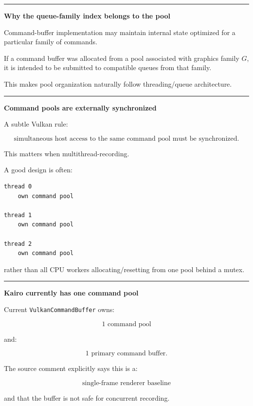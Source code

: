 \begin{center}\rule{0.5\linewidth}{0.5pt}\end{center}

\textbf{Why the queue-family index belongs to the pool}

Command-buffer implementation may maintain internal state optimized for a particular family of commands.

If a command buffer was allocated from a pool associated with graphics family \(G\), it is intended to be submitted to compatible queues from that family.

This makes pool organization naturally follow threading/queue architecture.

\begin{center}\rule{0.5\linewidth}{0.5pt}\end{center}

\textbf{Command pools are externally synchronized}

A subtle Vulkan rule:

\[
\boxed{
\text{simultaneous host access to the same command pool must be synchronized}.
}
\]

This matters when multithread-recording.

A good design is often:

\begin{verbatim}
thread 0
    own command pool

thread 1
    own command pool

thread 2
    own command pool
\end{verbatim}

rather than all CPU workers allocating/resetting from one pool behind a mutex.

\begin{center}\rule{0.5\linewidth}{0.5pt}\end{center}

\textbf{Kairo currently has one command pool}

Current \texttt{VulkanCommandBuffer} owns:

\[
1\text{ command pool}
\]

and:

\[
1\text{ primary command buffer}.
\]

The source comment explicitly says this is a:

\[
\boxed{\text{single-frame renderer baseline}}
\]

and that the buffer is not safe for concurrent recording.

